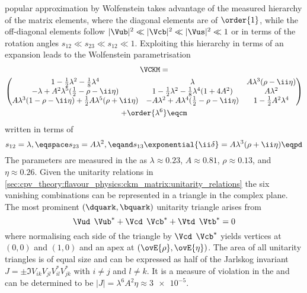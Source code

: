popular approximation by Wolfenstein \cite{Wolfenstein:1983yz} takes advantage
of the measured hierarchy of the matrix elements, where the diagonal elements
are of $\order{1}$, while the off-diagonal elements follow $\vert\Vub\vert^2 \ll
\vert\Vcb\vert^2 \ll \vert\Vus\vert^2 \ll 1$ or in terms of the rotation angles
$s_{12} \ll s_{23} \ll s_{12} \ll 1$. Exploiting this hierarchy in terms of an
expansion leads to the Wolfenstein parametrisation
%
\begin{multline}  
  \VCKM = \\
  \begin{pmatrix}
    1 - \frac{1}{2} \lambda^2 - \frac{1}{8} \lambda^4                           & \lambda                                                         & A \lambda^3 (\rho - \ii\eta)  \\
    -\lambda + A^2 \lambda^5 (\frac{1}{2} - \rho - \ii\eta)                     & 1 - \frac{1}{2} \lambda^2 - \frac{1}{8} \lambda^4 ( 1 + 4 A^2 ) & A \lambda^2                   \\
    A \lambda^3 (1 - \rho - \ii\eta) + \frac{1}{2} A \lambda^5 (\rho + \ii\eta) & - A \lambda^2 + A \lambda^4 (\frac{1}{2} - \rho - \ii\eta)      & 1 - \frac{1}{2} A^2 \lambda^4 \\
  \end{pmatrix}\\
  + \order{\lambda^6} \eqcm
\end{multline}
%
written in terms of
%
\begin{equation}
  s_{12} = \lambda, \eqspace s_{23} = A \lambda^2, \eqand s_{13}\exponential{\ii\delta} = A \lambda^3 (\rho + \ii\eta) \eqpd
\end{equation}
%
The parameters are measured in the \SM as $\lambda \approx 0.23$, $A \approx
0.81$, $\rho \approx 0.13$, and $\eta \approx 0.26$. Given the unitarity
relations in
\cref{sec:cpv_theory:flavour_physics:ckm_matrix:unitarity_relations} the six
vanishing combinations can be represented in a triangle in the complex plane.
The most prominent ${(\dquark,\bquark)}$ unitarity triangle arises from
%
\begin{equation}
  \Vud^{\phantom{\ast}}\Vub^{\ast} + \Vcd^{\phantom{\ast}}\Vcb^{\ast} + \Vtd^{\phantom{\ast}}\Vtb^{\ast} = 0 
\end{equation}
%
where normalising each side of the triangle by
$\Vcd^{\phantom{\ast}}\Vcb^{\ast}$ yields vertices at ${(0,0)}$ and ${(1,0)}$
and an apex at ${(\ovE{\rho},\ovE{\eta})}$. The area of all unitarity triangles
is of equal size and can be expressed as half of the Jarlskog invariant $J = \pm
\Im V_{ik}^{\phantom{\ast}} V_{jl}^{\phantom{\ast}} V_{il}^{\ast} V_{jk}^{\ast}$
with $i \neq j$ and $l \neq k$. It is a measure of \CP violation in the \SM and
can be determined to be $\vert J \vert = \lambda^6 A^2 \eta \approx \num{3e-5}$.

